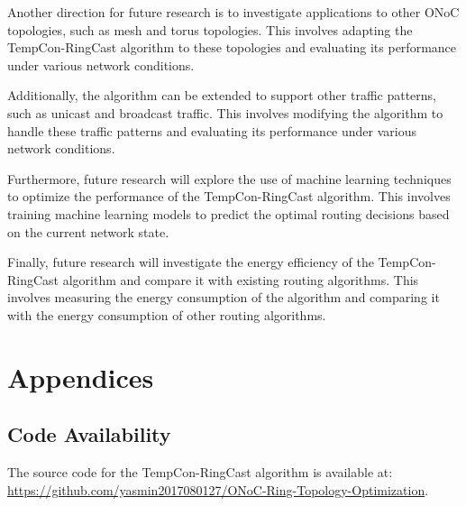 \documentclass[12pt]{article}
\begin{document}
Another direction for future research is to investigate applications to other ONoC topologies, such as mesh and torus topologies. This involves adapting the TempCon-RingCast algorithm to these topologies and evaluating its performance under various network conditions.

Additionally, the algorithm can be extended to support other traffic patterns, such as unicast and broadcast traffic. This involves modifying the algorithm to handle these traffic patterns and evaluating its performance under various network conditions.

Furthermore, future research will explore the use of machine learning techniques to optimize the performance of the TempCon-RingCast algorithm. This involves training machine learning models to predict the optimal routing decisions based on the current network state.

Finally, future research will investigate the energy efficiency of the TempCon-RingCast algorithm and compare it with existing routing algorithms. This involves measuring the energy consumption of the algorithm and comparing it with the energy consumption of other routing algorithms.

\chapter{Appendices}
\section{Code Availability}
The source code for the TempCon-RingCast algorithm is available at: \href{https://github.com/yasmin2017080127/ONoC-Ring-Topology-Optimization}{https://github.com/yasmin2017080127/ONoC-Ring-Topology-Optimization}.

\newpage



\end{document}
